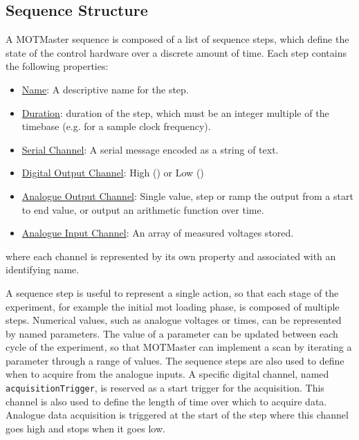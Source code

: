\subsection{Sequence Structure}
A MOTMaster sequence is composed of a list of sequence steps, which define
the state of the control hardware over a discrete amount of time.
Each step
contains the following properties:
\begin{itemize}
    \item \underline{Name}: A descriptive name for the step.
    \item \underline{Duration}: duration of the step, which must be an integer multiple of the timebase (e.g.  for a 
    sample clock frequency).
    \item \underline{Serial Channel}: A serial message encoded as a string of text.
    \item \underline{Digital Output Channel}: High () or Low ()
    \item \underline{Analogue Output Channel}: Single value, step or ramp the output from a start to end value, or output an arithmetic function over time.
    \item \underline{Analogue Input Channel}: An array of measured
      voltages stored.
\end{itemize}
where each channel is represented by its own property and associated
with an identifying name.
\par\noindent
A sequence step is useful to represent a single action, so that each
stage of the experiment, for example the initial \ac{mot} loading phase, is
composed of multiple steps. Numerical values, such as analogue voltages or
times, can be represented by named parameters. The value of a parameter can
be updated between each cycle of the experiment, so that MOTMaster can
implement a scan by iterating a parameter through a range of values. The sequence steps are also used to
define when to acquire from the analogue inputs. A specific digital channel,
named \verb|acquisitionTrigger|, is reserved as a start trigger for the
acquisition. This channel is also used to define the length of time over which to acquire data. Analogue data acquisition is triggered at the start of the step where this channel goes high and stops when it goes low. 
